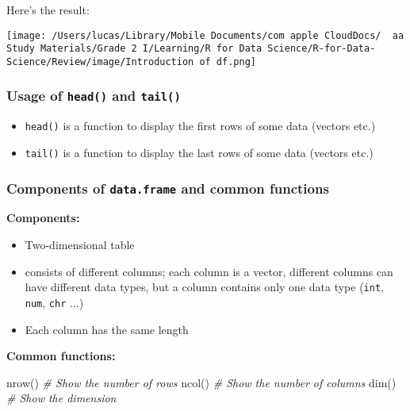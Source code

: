 \documentclass[
]{article}
\newenvironment{Shaded}{}{}
\newcommand{\CommentTok}[1]{\textcolor[rgb]{0.38,0.63,0.69}{\textit{#1}}}
\newcommand{\FunctionTok}[1]{\textcolor[rgb]{0.02,0.16,0.49}{#1}}
\newcommand{\NormalTok}[1]{#1}
\begin{document}
Here's the result:

\texttt{[image: /Users/lucas/Library/Mobile Documents/com~apple~CloudDocs/~~aa Study Materials/Grade 2 I/Learning/R for Data Science/R-for-Data-Science/Review/image/Introduction of df.png]}

\hypertarget{usage-of-head-and-tail}{%
\subsubsection{\texorpdfstring{\textbf{Usage of \texttt{head()} and
\texttt{tail()}}}{Usage of head() and tail()}}\label{usage-of-head-and-tail}}

\begin{itemize}
\item
  \texttt{head()} is a function to display the first rows of some data
  (vectors etc.)
\item
  \texttt{tail()} is a function to display the last rows of some data
  (vectors etc.)
\end{itemize}

\hypertarget{components-of-dataframe-and-common-functions}{%
\subsubsection{\texorpdfstring{Components of \texttt{data.frame} and
common
functions}{Components of data.frame and common functions}}\label{components-of-dataframe-and-common-functions}}

\textbf{Components:}

\begin{itemize}
\item
  Two-dimensional table
\item
  consists of different columns; each column is a vector, different
  columns can have different data types, but a column contains only one
  data type (\texttt{int}, \texttt{num}, \texttt{chr} ...)
\item
  Each column has the same length
\end{itemize}

\textbf{Common functions:}

\begin{Shaded}
\begin{Highlighting}[]
\FunctionTok{nrow}\NormalTok{() }\CommentTok{\# Show the number of rows}
\FunctionTok{ncol}\NormalTok{() }\CommentTok{\# Show the number of columns}
\FunctionTok{dim}\NormalTok{()  }\CommentTok{\# Show the dimension}
\end{Highlighting}
\end{Shaded}
\end{document}
